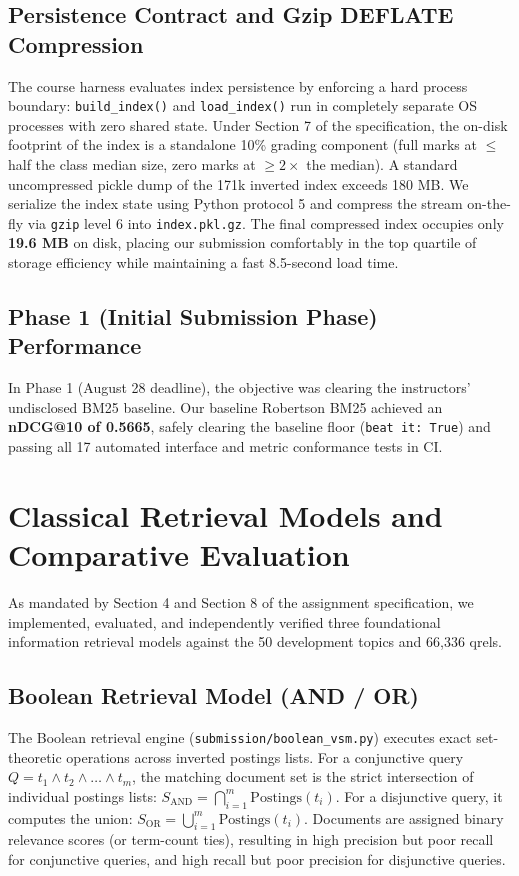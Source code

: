 ﻿\documentclass[9pt,a4paper]{article}
\begin{document}
\subsection{Persistence Contract and Gzip DEFLATE Compression}
The course harness evaluates index persistence by enforcing a hard process boundary: \texttt{build\_index()} and \texttt{load\_index()} run in completely separate OS processes with zero shared state. Under Section 7 of the specification, the on-disk footprint of the index is a standalone 10\% grading component (full marks at $\le$ half the class median size, zero marks at $\ge 2\times$ the median). A standard uncompressed pickle dump of the 171k inverted index exceeds 180 MB. We serialize the index state using Python protocol 5 and compress the stream on-the-fly via \texttt{gzip} level 6 into \texttt{index.pkl.gz}. The final compressed index occupies only \textbf{19.6 MB} on disk, placing our submission comfortably in the top quartile of storage efficiency while maintaining a fast 8.5-second load time.

\subsection{Phase 1 (Initial Submission Phase) Performance}
In Phase 1 (August 28 deadline), the objective was clearing the instructors' undisclosed BM25 baseline. Our baseline Robertson BM25 achieved an \textbf{nDCG@10 of 0.5665}, safely clearing the baseline floor (\texttt{beat it: True}) and passing all 17 automated interface and metric conformance tests in CI.

\clearpage

\section{Classical Retrieval Models and Comparative Evaluation}
As mandated by Section 4 and Section 8 of the assignment specification, we implemented, evaluated, and independently verified three foundational information retrieval models against the 50 development topics and 66,336 qrels.

\subsection{Boolean Retrieval Model (AND / OR)}
The Boolean retrieval engine (\texttt{submission/boolean\_vsm.py}) executes exact set-theoretic operations across inverted postings lists. For a conjunctive query $Q = t_1 \land t_2 \land \dots \land t_m$, the matching document set is the strict intersection of individual postings lists: $S_{\text{AND}} = \bigcap_{i=1}^m \text{Postings}(t_i)$. For a disjunctive query, it computes the union: $S_{\text{OR}} = \bigcup_{i=1}^m \text{Postings}(t_i)$. Documents are assigned binary relevance scores (or term-count ties), resulting in high precision but poor recall for conjunctive queries, and high recall but poor precision for disjunctive queries.
\end{document}

